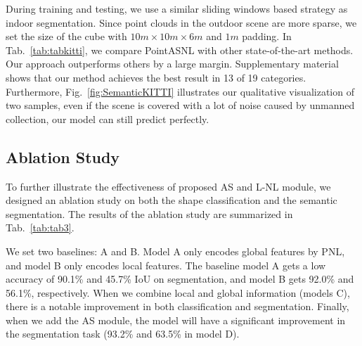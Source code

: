 \documentclass[10pt,twocolumn,letterpaper]{article}
\begin{document}
	During training and testing, we use a similar sliding windows based strategy as indoor segmentation. Since point clouds in the outdoor scene are more sparse, we set the size of the cube with $10m\times10m\times6m$  and $1m$ padding. In Tab.~\ref{tab:tabkitti}, we compare PointASNL with other state-of-the-art methods. Our approach outperforms others by a large margin. Supplementary material shows that our method achieves the best result in 13 of 19 categories. Furthermore, Fig.~\ref{fig:SemanticKITTI} illustrates our qualitative visualization of two samples, even if the scene is covered with a lot of noise caused by unmanned collection, our model can still predict perfectly.
	
	




	


	


	
	
	
	
	\subsection{Ablation Study}
	To further illustrate the effectiveness of proposed AS and L-NL module, we designed an ablation study on both the shape classification and the semantic segmentation. The results of the ablation study are summarized in Tab.~\ref{tab:tab3}.  
	
	We set two baselines: A and B. Model A only encodes global features by PNL, and model B only encodes local features. The baseline model A gets a low accuracy of 90.1\% and 45.7\% IoU on segmentation, and model B gets 92.0\% and 56.1\%, respectively. When we combine local and global information (models C), there is a notable improvement in both classification and segmentation. Finally, when we add the AS module, the model will have a significant improvement in the segmentation task (93.2\% and 63.5\% in model D). 
	
\end{document}
